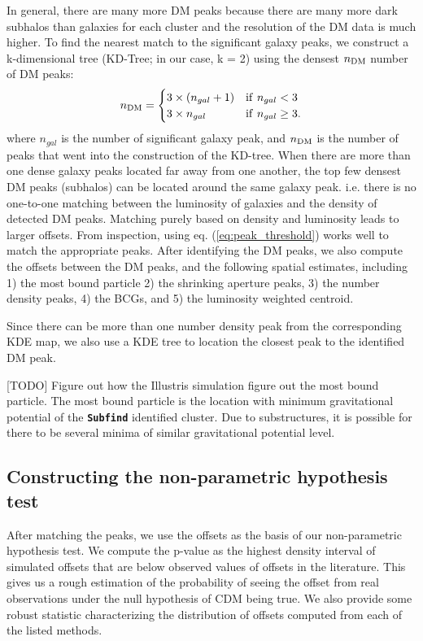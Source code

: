 In general, there are many more DM peaks because there are many more dark 
subhalos than galaxies for each cluster and the resolution of the DM data is
much higher. To find the nearest match to the significant galaxy peaks,  
we construct a k-dimensional tree (KD-Tree; in our case, k = 2) 
using the densest $n_{\rm DM}$  number of DM peaks:
\begin{equation}
	n_{\rm DM} = \begin{cases}		
		3 \times (n_{gal} + 1) & {\rm if~} n_{gal} < 3 \\
	3 \times n_{gal}  & {\rm if~} n_{gal} \geq 3.
	\end{cases}
	\label{eq:peak_threshold}
\end{equation}
where $n_{gal}$ is the number of significant galaxy peak, and $n_{\rm DM}$
is the number of peaks that went into the construction of the KD-tree.
When there are more
than one dense galaxy peaks located far away from one another, 
the top few densest DM peaks (subhalos) 
can be located around the same galaxy peak.
i.e. there is no one-to-one matching between the luminosity of galaxies and the
density of detected DM peaks.
Matching purely based on density and luminosity leads to larger offsets.
From inspection, using eq. (\ref{eq:peak_threshold}) works well to match the 
appropriate peaks.  After identifying the DM peaks, we also compute the 
offsets 
between the DM peaks, and the following spatial estimates, including 
1) the most bound particle 
2) the shrinking aperture peaks, 
3) the number density peaks, 
4) the BCGs, and
5) the luminosity weighted centroid.

Since there can be more than one number density peak from the corresponding KDE
map, we also use a KDE tree to location the closest peak to the identified DM
peak.

[TODO] Figure out how the Illustris simulation figure out the most bound 
particle.
The most bound particle is the location with minimum 
gravitational potential of the {\bf \texttt{Subfind}} identified cluster.
Due to substructures, it is possible for there to be several minima of similar 
gravitational potential level. 

\subsection{Constructing the non-parametric hypothesis test} 

After matching the peaks, we use the offsets as the basis of our 
non-parametric hypothesis test. 
We compute the p-value as the highest density interval of simulated offsets 
that are below observed values of 
offsets in the literature.  
This gives us a rough estimation of the probability 
of seeing the offset from real observations under the null hypothesis of CDM 
being true. We also provide some robust statistic characterizing the 
distribution of offsets computed from each of the listed methods.

